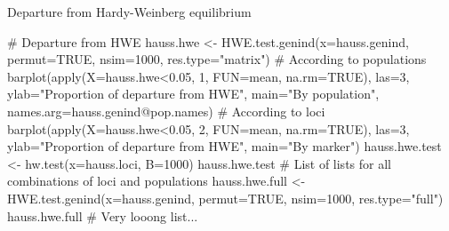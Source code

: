 \documentclass[compress, ucs, xelatex, 11pt, xcolor=svgnames,
  hyperref={
    bookmarks=true,
    unicode=true,
    colorlinks=true,
    pdftitle={Molecular data in R},
    plainpages=false,
    pdfauthor={Vojtech Zeisek},
    pdfsubject={Course about phylogeny and evolution in R},
    pdfcreator={XeLaTeX},
    pdfkeywords={R, evolution, phylogeny, molecular data},
    linkcolor=Tomato,
    anchorcolor=SaddleBrown,
    citecolor=Goldenrod,
    filecolor=DarkMagenta,
    menucolor=Sienna,
    urlcolor=DarkTurquoise,
    pdftex},
  url={hyphens, lowtilde} %
  ]{beamer}
\begin{document}
\begin{frame}[fragile]{Departure from Hardy-Weinberg equilibrium}
  \begin{spluscode}
    # Departure from HWE
    hauss.hwe <- HWE.test.genind(x=hauss.genind, permut=TRUE,
      nsim=1000, res.type="matrix")
    # According to populations
    barplot(apply(X=hauss.hwe<0.05, 1, FUN=mean, na.rm=TRUE),
      las=3, ylab="Proportion of departure from HWE", main="By
      population", names.arg=hauss.genind@pop.names)
    # According to loci
    barplot(apply(X=hauss.hwe<0.05, 2, FUN=mean, na.rm=TRUE),
      las=3, ylab="Proportion of departure from HWE", main="By marker")
    hauss.hwe.test <- hw.test(x=hauss.loci, B=1000)
    hauss.hwe.test
    # List of lists for all combinations of loci and populations
    hauss.hwe.full <- HWE.test.genind(x=hauss.genind, permut=TRUE,
      nsim=1000, res.type="full")
    hauss.hwe.full # Very looong list...
  \end{spluscode}
\end{frame}
\end{document}
